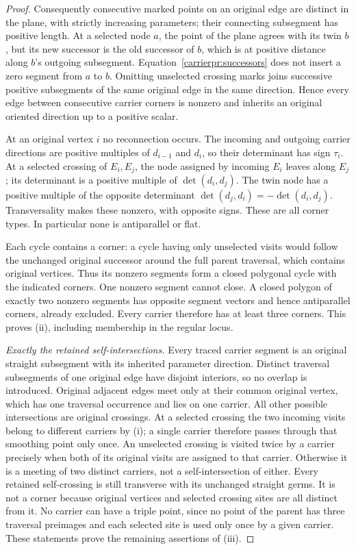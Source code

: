 \begin{proof}
Consequently consecutive marked points on an original edge are
distinct in the plane, with strictly increasing parameters; their
connecting subsegment has positive length. At a selected node $a$,
the point of the plane agrees with its twin $b$, but its new successor
is the old successor of $b$, which is at positive distance along
$b$'s outgoing subsegment. Equation~\eqref{carrierpr:successors}
does not insert a zero segment from $a$ to $b$.
Omitting unselected crossing marks joins successive positive subsegments
of the same original edge in the same direction. Hence every edge
between consecutive carrier corners is nonzero and inherits an
original oriented direction up to a positive scalar.

At an original vertex $i$ no reconnection occurs. The incoming and
outgoing carrier directions are positive multiples of $d_{i-1}$ and
$d_i$, so their determinant has sign $\tau_i$. At a selected crossing
of $E_i,E_j$, the node assigned by incoming $E_i$ leaves along $E_j$;
its determinant is a positive multiple of $\det(d_i,d_j)$. The twin
node has a positive multiple of the opposite determinant
$\det(d_j,d_i)=-\det(d_i,d_j)$. Transversality makes these nonzero,
with opposite signs. These are all corner types. In particular none
is antiparallel or flat.

Each cycle contains a corner: a cycle having only unselected visits
would follow the unchanged original successor around the full parent
traversal, which contains original vertices. Thus its nonzero segments
form a closed polygonal cycle with the indicated corners. One nonzero
segment cannot close. A closed polygon of exactly two nonzero segments
has opposite segment vectors and hence antiparallel corners, already
excluded. Every carrier therefore has at least three corners. This
proves (ii), including membership in the regular locus.

\emph{Exactly the retained self-intersections.}
Every traced carrier segment is an original straight subsegment with
its inherited parameter direction. Distinct traversal subsegments of
one original edge have disjoint interiors, so no overlap is introduced.
Original adjacent edges meet only at their common original vertex,
which has one traversal occurrence and lies on one carrier. All other
possible intersections are original crossings. At a selected crossing
the two incoming visits belong to different carriers by (i); a single
carrier therefore passes through that smoothing point only once.
An unselected crossing is visited twice by a carrier precisely when
both of its original visits are assigned to that carrier. Otherwise
it is a meeting of two distinct carriers, not a self-intersection of
either. Every retained self-crossing is still transverse with its
unchanged straight germs. It is not a corner because original vertices
and selected crossing sites are all distinct from it. No carrier can
have a triple point, since no point of the parent has three traversal
preimages and each selected site is used only once by a given carrier.
These statements prove the remaining assertions of (iii).
\end{proof}

